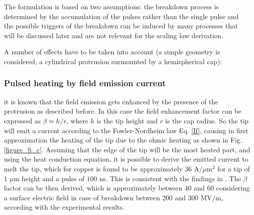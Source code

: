 The formulation is based on two assumptions: the breakdown process is determined by the accumulation of the pulses rather than the single pulse and the possible triggers of the breakdown can be induced by many processes that will be discussed later and are not relevant for the scaling law derivation.

A number of effects have to be taken into account (a simple geometry is considered, a cylindrical protrusion surmounted by a hemispherical  cap): 

\subsubsection{Pulsed heating by field emission current}

it is known that the field emission gets enhanced by the presence of the protrusion as described before. In this case the field enhancement factor can be expressed as $\beta \simeq h/r$, where $h$ is the tip height and $r$ is the cap radius. So the tip will emit a current according to the Fowler-Nordheim law Eq. \ref{If}, causing in first approximation the heating of the tip due to the ohmic heating as shown in Fig. \ref{figure_S_c}. Assuming that the edge of the tip will be the most heated part, and using the heat conduction equation, it is possible to derive the emitted current to melt the tip, which for copper is found to be approximately $36$ A/$\mu$m$^2$ for a tip of $1$  $\mu$m height and a pulse of $100$ ns. This is consistent with the findings in \cite{soviet:1983}. The $\beta$ factor can be then derived, which is approximately between 40 and 60 considering a surface electric field in case of breakdown between 200 and $300$ MV/m, according with the experimental results.

